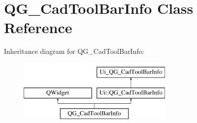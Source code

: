 \hypertarget{classQG__CadToolBarInfo}{\section{Q\-G\-\_\-\-Cad\-Tool\-Bar\-Info Class Reference}
\label{classQG__CadToolBarInfo}
}
Inheritance diagram for Q\-G\-\_\-\-Cad\-Tool\-Bar\-Info\-:\begin{figure}[H]
\begin{center}
\leavevmode
\includegraphics[height=3.000000cm]{classQG__CadToolBarInfo}
\end{center}
\end{figure}

